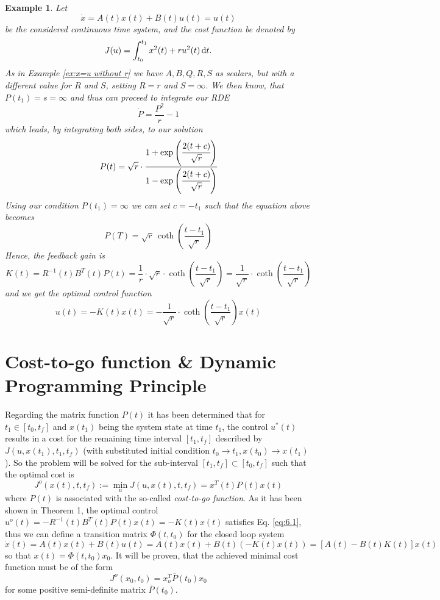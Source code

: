 \documentclass[paper=a4, pagesize, DIV=calc, BCOR=12.5mm, twoside=on, onecolumn=on, open = any, titlepage =on, parskip =half-, headsepline = on, footsepline = on, chapterprefix = on, appendixprefix = off, fontsize = 12pt, numbers = noenddot, abstract = on]{scrbook}
\numberwithin{equation}{chapter}
\theoremstyle{definition}
\theoremstyle{plain}
\newtheorem{beispiel}{Example}
\theoremstyle{plain}
\theoremstyle{remark}
\theoremstyle{plain}
\theoremstyle{plain}
\begin{document}
\begin{beispiel}
\label{ex:x=u, R=1}
Let \[\dot{x} = A(t)x(t) + B(t)u(t) = u(t)\] be the considered continuous time system, and the cost function be denoted by \[
J(u) = \int_{t_0}^{t_1} x^2(t) + ru^2(t) \mathop{}\!\mathrm{d} t.
\]
As in Example \ref{ex:x=u without r} we have $A,B,Q,R,S$ as scalars, but with a different value for $R$ and $S$, setting $R=r$ and $S=\infty$. We then know, that $P(t_1)=s = \infty$ and thus can proceed to integrate our RDE
\[
\dot{P} = \frac{P^2}{r} - 1
\]
which leads, by integrating both sides, to our solution
\[
P(t) = \sqrt{r} \cdot \cfrac{1+\exp \left(\cfrac{2(t+c)}{\sqrt{r}}\right)}{1- \exp \left(\cfrac{2(t+c)}{\sqrt{r}}\right)}
\]
Using our condition $P(t_1) = \infty$ we can set $c=-t_1$ such that the equation above becomes
\[
P(T) = \sqrt{r} \, \coth\left(\frac{t-t_1}{\sqrt{r}}\right)
\]
Hence, the feedback gain is
\[
K(t)=R^{-1}(t)B^T(t)P(t) = \frac{1}{r}\cdot \sqrt{r} \cdot \coth\left(\frac{t-t_1}{\sqrt{r}}\right) = \frac{1}{\sqrt{r}} \cdot \coth\left(\frac{t-t_1}{\sqrt{r}}\right)
\]
and we get the optimal control function
\[
u(t) = -K(t)x(t) = - \frac{1}{\sqrt{r}} \cdot \coth\left(\frac{t-t_1}{\sqrt{r}}\right)x(t)
\]
\end{beispiel}

\par \singlespacing
\section{Cost-to-go function \& Dynamic Programming Principle}
\label{sec:CTG}
\par \onehalfspacing
Regarding the matrix function $P(t)$ it has been determined that for $t_1 \in \left[t_0, t_f\right]$ and $x(t_1)$ being the system state at time $t_1$, the control $u^*(t)$ results in a cost for the remaining time interval $\left[t_1, t_f \right]$ described by $J(u, x(t_1), t_1, t_f)$ (with substituted initial condition $t_0 \rightarrow t_1, x(t_0) \rightarrow x(t_1)$). So the problem will be solved for the sub-interval $\left[ t_1, t_f\right] \subset \left[ t_0, t_f \right]$ such that the optimal cost is
\begin{equation}
J^o(x(t), t, t_f) := \min_u J(u, x(t), t, t_f) = x^T(t)P(t)x(t)
\end{equation}
where $P(t)$ is associated with the so-called \emph{cost-to-go function}.
As it has been shown in Theorem 1, the optimal control $u^o(t) = -R^{-1}(t)B^T(t)P(t)x(t) = -K(t)x(t)$ satisfies Eq. \eqref{eq:6.1}, thus we can define a transition matrix $\Phi(t, t_0)$ for the closed loop system 
\[
\dot{x}(t) = A(t)x(t) + B(t)u(t) = A(t)x(t) + B(t)(-K(t)x(t)) = \left[A(t)-B(t)K(t)\right]x(t)
\]
so that $x(t) = \Phi(t, t_0)x_0$. It will be proven, that the achieved minimal cost function must be of the form
\[
J^o(x_0,t_0) = x_o^T\overline{P}(t_0)x_0
\]
for some positive semi-definite matrix $\overline{P}(t_0)$.
\par \singlespacing
\end{document}
